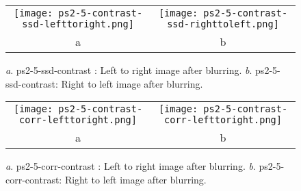 \documentclass[a4paper,11pt]{article}
\begin{document}

\begin{figure}[H]
\begin{center}
\begin{tabular}{cc}
	\texttt{[image: ps2-5-contrast-ssd-lefttoright.png]}&
	\texttt{[image: ps2-5-contrast-ssd-righttoleft.png]}\\
	a&b
\end{tabular}
\end{center}
\caption{ 
\textit{a}. ps2-5-ssd-contrast : Left to right image after blurring.  \textit{b}. ps2-5-ssd-contrast: Right to left image after blurring. }
\label{ps2-1}
\end{figure}


 \begin{figure}[H]
\begin{center}
\begin{tabular}{cc}
	\texttt{[image: ps2-5-contrast-corr-lefttoright.png]}&
	\texttt{[image: ps2-5-contrast-corr-lefttoright.png]}\\
	a&b
\end{tabular}
\end{center}
\caption{ 
\textit{a}. ps2-5-corr-contrast : Left to right image after blurring.  \textit{b}. ps2-5-corr-contrast: Right to left image after blurring. }
\label{ps2-1}
\end{figure}
\end{document}
